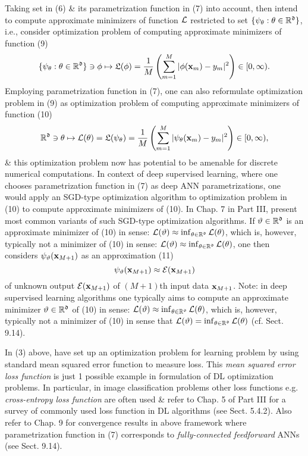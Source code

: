 \documentclass{article}
\begin{document}
\begin{enumerate}
	Taking set in (6) \& its parametrization function in (7) into account, then intend to compute approximate minimizers of function ${\cal L}$ restricted to set $\{\psi_\theta:\theta\in\mathbb{R}^{\frak d}\}$, i.e., consider optimization problem of computing approximate minimizers of function (9)
	\begin{equation}
		\{\psi_\theta:\theta\in\mathbb{R}^{\frak d}\}\ni\phi\mapsto{\frak L}(\phi) = \frac{1}{M}\left(\sum_{m=1}^M |\phi({\bf x}_m) - y_m|^2\right)\in[0,\infty).
	\end{equation}
	Employing parametrization function in (7), one can also reformulate optimization problem in (9) as optimization problem of computing approximate minimizers of function (10)
	\begin{equation}
		\mathbb{R}^{\frak d}\ni\theta\mapsto{\cal L}(\theta) = {\frak L}(\psi_\theta) = \frac{1}{M}\left(\sum_{m=1}^M |\psi_\theta({\bf x}_m) - y_m|^2\right)\in[0,\infty),
	\end{equation}
	\& this optimization problem now has potential to be amenable for discrete numerical computations. In context of deep supervised learning, where one chooses parametrization function in (7) as deep ANN parametrizations, one would apply an SGD-type optimization algorithm to optimization problem in (10) to compute approximate minimizers of (10). In Chap. 7 in Part III, present most common variants of such SGD-type optimization algorithms. If $\vartheta\in\mathbb{R}^{\frak d}$ is an approximate minimizer of (10) in sense: ${\cal L}(\vartheta)\approx\inf_{\theta\in\mathbb{R}^{\frak d}} {\cal L}(\theta)$, which is, however, typically not a minimizer of (10) in sense: ${\cal L}(\vartheta)\approx\inf_{\theta\in\mathbb{R}^{\frak d}} {\cal L}(\theta)$, one then considers $\psi_\vartheta({\bf x}_{M+1})$ as an approximation (11)
	\begin{equation}
		\psi_\vartheta({\bf x}_{M+1})\approx{\cal E}({\bf x}_{M+1})
	\end{equation}
	of unknown output ${\cal E}({\bf x}_{M+1})$ of $(M + 1)$th input data ${\bf x}_{M+1}$. Note: in deep supervised learning algorithms one typically aims to compute an approximate minimizer $\vartheta\in\mathbb{R}^{\frak d}$ of (10) in sense: ${\cal L}(\vartheta)\approx\inf_{\theta\in\mathbb{R}^{\frak d}} {\cal L}(\theta)$, which is, however, typically not a minimizer of (10) in sense that ${\cal L}(\vartheta) = \inf_{\theta\in\mathbb{R}^{\frak d}} {\cal L}(\theta)$ (cf. Sect. 9.14).
	
	In (3) above, have set up an optimization problem for learning problem by using standard mean squared error function to measure loss. This {\it mean squared error loss function} is just 1 possible example in formulation of DL optimization problems. In particular, in image classification problems other loss functions e.g. {\it cross-entropy loss function} are often used \& refer to Chap. 5 of Part III for a survey of commonly used loss function in DL algorithms (see Sect. 5.4.2). Also refer to Chap. 9 for convergence results in above framework where parametrization function in (7) corresponds to {\it fully-connected feedforward} ANNs (see Sect. 9.14).
	

\end{enumerate}
\end{document}

